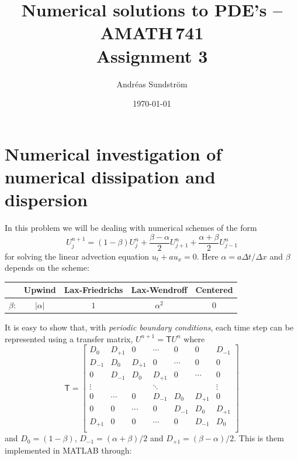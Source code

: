 \documentclass[11pt,letter, swedish, english
]{article}
\newcommand{\Dx}{\ensuremath{\Delta{x}}}
\newcommand{\Dt}{\ensuremath{\Delta{t}}}
\begin{document}

\title{Numerical solutions to PDE's -- AMATH\,741 \\
Assignment 3}
\author{Andréas Sundström}
\date{\today}

\maketitle


\section{Numerical investigation of numerical dissipation and dispersion}
In this problem we will be dealing with numerical schemes of the form
\begin{equation}
U_j^{n+1}=(1-\beta)U_j^n+\frac{\beta-\alpha}{2}U_{j+1}^n+\frac{\alpha+\beta}{2}U_{j-1}^n
\end{equation}
for solving the linear advection equation $u_t+au_x=0$. Here
$\alpha=a\Dt/\Dx$ and $\beta$ depends on the scheme:
\begin{center}
\begin{tabular}{l|c|c|c|c|}\cline{2-5}
& Upwind & Lax-Friedrichs & Lax-Wendroff & Centered\\ \hline
\multicolumn{1}{|l|}{$\beta$: }&$|\alpha|$&$1$&$\alpha^2$&0\\ \hline
\end{tabular}
\end{center}

It is easy to show that, with \emph{periodic boundary conditions},
each time step can be represented using a transfer matrix,
$U^{n+1}=\mathsf{T}U^n$ where
\begin{equation}
\mathsf{T}=\begin{bmatrix}
D_0&D_{+1}&0&\cdots&0&0&D_{-1}\\
D_{-1}&D_0&D_{+1}&0&\cdots&0&0\\
0&D_{-1}&D_0&D_{+1}&0&\cdots&0\\
\vdots&&&\ddots&&&\vdots\\
0&\cdots&0&D_{-1}&D_0&D_{+1}&0\\
0&0&\cdots&0&D_{-1}&D_0&D_{+1}\\
D_{+1}&0&0&\cdots&0&D_{-1}&D_0\\
\end{bmatrix}
\end{equation}
and $D_0=(1-\beta)$, $D_{-1}=(\alpha+\beta)/2$ and
$D_{+1}=(\beta-\alpha)/2$. 
This is them implemented in MATLAB through:

\end{document}
